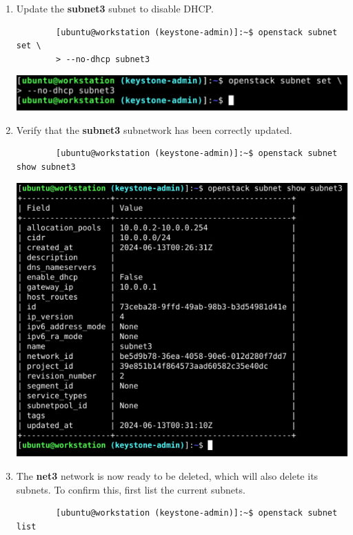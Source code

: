 \documentclass[letterpaper, 12pt]{article}
\begin{document}
\begin{enumerate}
    \item Update the \textbf{subnet3} subnet to disable DHCP.
    \begin{lstlisting}
        [ubuntu@workstation (keystone-admin)]:~$ openstack subnet set \
        > --no-dhcp subnet3
    \end{lstlisting}

    \begin{center}
        \includegraphics[width=\linewidth]{images/part3/step21.png}
    \end{center}

    \item Verify that the \textbf{subnet3} subnetwork has been correctly updated.
    \begin{lstlisting}
        [ubuntu@workstation (keystone-admin)]:~$ openstack subnet show subnet3
    \end{lstlisting}

    \begin{center}
        \includegraphics[width=\linewidth]{images/part3/step22.png}
    \end{center}

    \item The \textbf{net3} network is now ready to be deleted, which will also delete its subnets. To confirm this,
    first list the current subnets.
    \begin{lstlisting}
        [ubuntu@workstation (keystone-admin)]:~$ openstack subnet list
    \end{lstlisting}


\end{enumerate}
\end{document}
